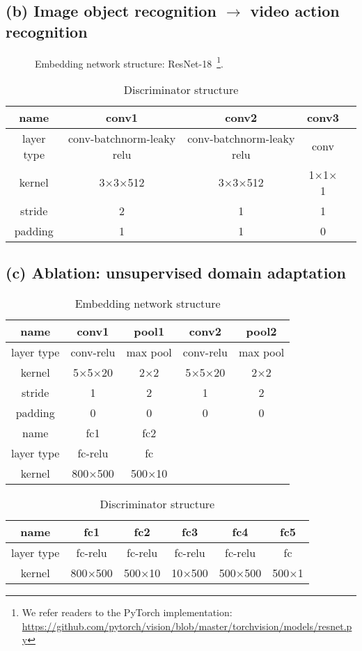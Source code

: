 \documentclass{article}
\begin{document}
\subsection*{(b) Image object recognition $\rightarrow$ video action recognition}
\ \ \ \ \ \ Embedding network structure: ResNet-18~\footnote{We refer readers to the PyTorch implementation: \url{https://github.com/pytorch/vision/blob/master/torchvision/models/resnet.py}}.

\begin{table}[htbp]
\centering
\caption{Discriminator structure}
\begin{tabular}{|c|c|c|c|c|}
\hline
name & conv1 &  conv2 & conv3\\
\hline
layer type & conv-batchnorm-leaky relu & conv-batchnorm-leaky relu & conv\\
kernel & 3$\times$3$\times$512  & 3$\times$3$\times$512 & 1$\times$1$\times$1\\
stride & 2 & 1 & 1\\
padding & 1 & 1 & 0\\
\hline
\end{tabular}
\end{table}

\subsection*{(c) Ablation: unsupervised domain adaptation}
\begin{table}[htbp]
\centering
\caption{Embedding network structure}
\begin{tabular}{|c|c|c|c|c|}
\hline
name & conv1 & pool1 & conv2 & pool2\\
\hline
\hline
layer type & conv-relu & max pool & conv-relu & max pool\\
kernel & 5$\times$5$\times$20 & 2$\times$2 & 5$\times$5$\times$20 & 2$\times$2\\
stride & 1 & 2 & 1 & 2\\
padding & 0 & 0 & 0 & 0\\
\hline
\hline
name & fc1 & fc2 & {} & {}\\
\hline
\hline
layer type & fc-relu & fc & {} & {}\\
kernel & 800$\times$500 & 500$\times$10 & {} & {}\\
\hline
\end{tabular}
\end{table}

\begin{table}[htbp]
\centering
\caption{Discriminator structure}
\begin{tabular}{|c|c|c|c|c|c|}
\hline
name & fc1 & fc2 & fc3 & fc4 & fc5\\
\hline
\hline
layer type & fc-relu & fc-relu & fc-relu & fc-relu & fc\\
kernel & 800$\times$500 & 500$\times$10 & 10$\times$500 & 500$\times$500 & 500$\times$1 \\
\hline
\end{tabular}
\end{table}
\end{document}

